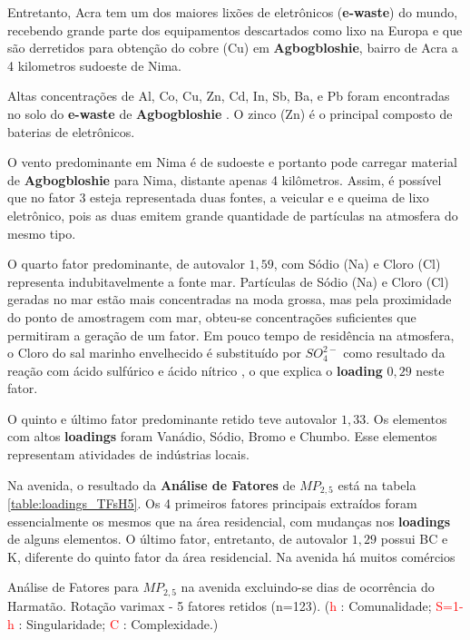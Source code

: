 Entretanto, Acra tem um dos maiores lixões de eletrônicos (\textbf{e-waste}) 
do mundo, recebendo grande parte dos equipamentos descartados como lixo na 
Europa e que são derretidos para obtenção do cobre (Cu) em \textbf{Agbogbloshie},
bairro de Acra a 4 kilometros sudoeste de Nima.  

Altas concentrações de Al, Co, Cu, Zn, Cd, In, Sb, Ba, e Pb foram encontradas
no solo do \textbf{e-waste} de \textbf{Agbogbloshie} \citep{asante2012}. 
O zinco (Zn) é o principal composto de baterias de eletrônicos. 

O vento predominante em Nima é de sudoeste e portanto pode carregar material 
de \textbf{Agbogbloshie} para Nima, distante apenas 4 kilômetros. 
Assim, é possível que no fator 3 esteja representada duas fontes, a veicular e 
e queima de lixo eletrônico, pois as duas emitem grande quantidade de partículas
na atmosfera do mesmo tipo. 

O quarto fator predominante, de autovalor $1,59$, com Sódio (Na) e Cloro (Cl)
representa indubitavelmente a fonte mar. 
Partículas de Sódio (Na) e Cloro (Cl) geradas no mar estão mais concentradas 
na moda grossa, mas pela proximidade do ponto de amostragem com mar, obteu-se
concentrações suficientes que permitiram a geração de um fator. 
Em pouco tempo de residência na atmosfera, o Cloro do sal marinho envelhecido 
é substituído por $SO_4^{2-}$ como resultado da reação com ácido sulfúrico e 
ácido nítrico \citep{mcinnes1994}, o que explica o \textbf{loading} $0,29$ 
neste fator.

O quinto e último fator predominante retido teve autovalor $1,33$. 
Os elementos com altos \textbf{loadings} foram Vanádio, Sódio, Bromo e Chumbo.
Esse elementos representam atividades de indústrias locais. 

Na avenida, o resultado da \textbf{Análise de Fatores} de $MP_{2,5}$ está na 
tabela \ref{table:loadings_TFsH5}. Os 4 primeiros fatores principais extraídos 
foram essencialmente os mesmos que na área residencial, com mudanças nos 
\textbf{loadings} de alguns elementos. O último fator, entretanto, de autovalor
$1,29$ possui BC e K, diferente do quinto fator da área residencial. 
Na avenida há muitos comércios   


\begin{table}[H]
  
  \caption{Análise de Fatores para $MP_{2,5}$ na avenida
           excluindo-se dias de ocorrência do Harmatão.
           Rotação varimax - 5 fatores retidos (n=123).
           (\textcolor{red}{h} : Comunalidade; 
           \textcolor{red}{S=1-h} : Singularidade; 
           \textcolor{red}{C} : Complexidade.)
           \label{table:loadings_TFsH5}}
\end{table}



